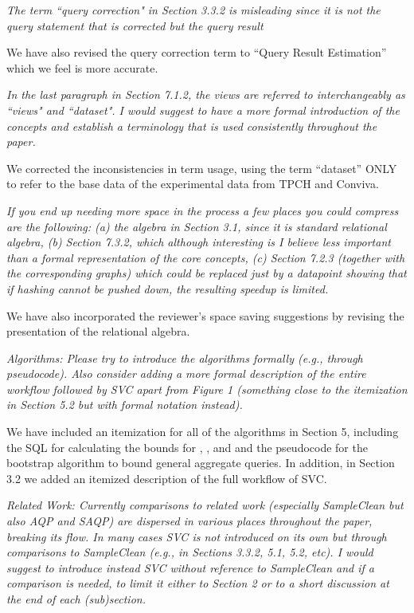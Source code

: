\vspace{1em}
\emph{The term ``query correction" in Section 3.3.2 is misleading since it is not the query statement that is corrected but the query result}

We have also revised the query correction term to “Query Result Estimation” which we feel is more accurate.

\vspace{1em}
\emph{In the last paragraph in Section 7.1.2, the views are referred to interchangeably as ``views" and ``dataset". I would suggest to have a more formal introduction of the concepts and establish a terminology that is used consistently throughout the paper.}

We corrected the inconsistencies in term usage, using the term “dataset” ONLY to refer to the base data of the experimental data from TPCH and Conviva. 

\vspace{1em}
\emph{If you end up needing more space in the process a few places you could compress are the following: (a) the algebra in Section 3.1, since it is standard relational algebra, (b) Section 7.3.2, which although interesting is I believe less important than a formal representation of the core concepts, (c) Section 7.2.3 (together with the corresponding graphs) which could be replaced just by a datapoint showing that if hashing cannot be pushed down, the resulting speedup is limited.}

We have also incorporated the reviewer’s space saving suggestions by revising the presentation of the relational algebra.

\vspace{1em}
\emph{Algorithms: Please try to introduce the algorithms formally (e.g., through pseudocode). Also consider adding a more formal description of the entire workflow followed by SVC apart from Figure 1 (something close to the itemization in Section 5.2 but with formal notation instead).}

We have included an itemization for all of the algorithms in Section 5, including the SQL for calculating the bounds for \sumfunc, \avgfunc, and \countfunc and the pseudocode for the bootstrap algorithm to bound general aggregate queries. In addition, in Section 3.2 we added an itemized description of the full workflow of SVC.

\vspace{1em}
\emph{Related Work: Currently comparisons to related work (especially SampleClean but also AQP and SAQP) are dispersed in various places throughout the paper, breaking its flow. In many cases SVC is not introduced on its own but through comparisons to SampleClean (e.g., in Sections 3.3.2, 5.1, 5.2, etc). I would suggest to introduce instead SVC without reference to SampleClean and if a comparison is needed, to limit it either to Section 2 or to a short discussion at the end of each (sub)section.}

